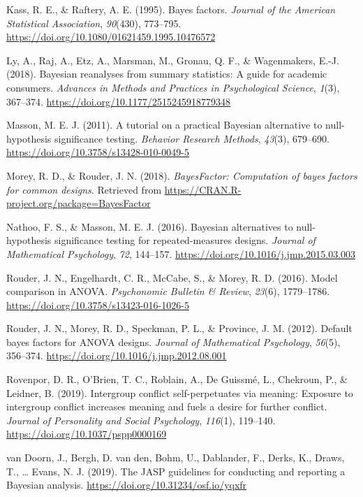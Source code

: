 \documentclass[doc]{apa6}
\begin{document}
\leavevmode\hypertarget{ref-kass1995}{}%
Kass, R. E., \& Raftery, A. E. (1995). Bayes factors. \emph{Journal of the American Statistical Association}, \emph{90}(430), 773--795. \url{https://doi.org/10.1080/01621459.1995.10476572}

\leavevmode\hypertarget{ref-ly2018}{}%
Ly, A., Raj, A., Etz, A., Marsman, M., Gronau, Q. F., \& Wagenmakers, E.-J. (2018). Bayesian reanalyses from summary statistics: A guide for academic consumers. \emph{Advances in Methods and Practices in Psychological Science}, \emph{1}(3), 367--374. \url{https://doi.org/10.1177/2515245918779348}

\leavevmode\hypertarget{ref-masson2011}{}%
Masson, M. E. J. (2011). A tutorial on a practical Bayesian alternative to null-hypothesis significance testing. \emph{Behavior Research Methods}, \emph{43}(3), 679--690. \url{https://doi.org/10.3758/s13428-010-0049-5}

\leavevmode\hypertarget{ref-BF}{}%
Morey, R. D., \& Rouder, J. N. (2018). \emph{BayesFactor: Computation of bayes factors for common designs}. Retrieved from \url{https://CRAN.R-project.org/package=BayesFactor}

\leavevmode\hypertarget{ref-nathoo2016}{}%
Nathoo, F. S., \& Masson, M. E. J. (2016). Bayesian alternatives to null-hypothesis significance testing for repeated-measures designs. \emph{Journal of Mathematical Psychology}, \emph{72}, 144--157. \url{https://doi.org/10.1016/j.jmp.2015.03.003}

\leavevmode\hypertarget{ref-rouder2016}{}%
Rouder, J. N., Engelhardt, C. R., McCabe, S., \& Morey, R. D. (2016). Model comparison in ANOVA. \emph{Psychonomic Bulletin \& Review}, \emph{23}(6), 1779--1786. \url{https://doi.org/10.3758/s13423-016-1026-5}

\leavevmode\hypertarget{ref-rouder2012}{}%
Rouder, J. N., Morey, R. D., Speckman, P. L., \& Province, J. M. (2012). Default bayes factors for ANOVA designs. \emph{Journal of Mathematical Psychology}, \emph{56}(5), 356--374. \url{https://doi.org/10.1016/j.jmp.2012.08.001}

\leavevmode\hypertarget{ref-rovenpor2019}{}%
Rovenpor, D. R., O'Brien, T. C., Roblain, A., De Guissmé, L., Chekroun, P., \& Leidner, B. (2019). Intergroup conflict self-perpetuates via meaning: Exposure to intergroup conflict increases meaning and fuels a desire for further conflict. \emph{Journal of Personality and Social Psychology}, \emph{116}(1), 119--140. \url{https://doi.org/10.1037/pspp0000169}

\leavevmode\hypertarget{ref-vanDoorn2019}{}%
van Doorn, J., Bergh, D. van den, Bohm, U., Dablander, F., Derks, K., Draws, T., \ldots{} Evans, N. J. (2019). The JASP guidelines for conducting and reporting a Bayesian analysis. \url{https://doi.org/10.31234/osf.io/yqxfr}
\end{document}
